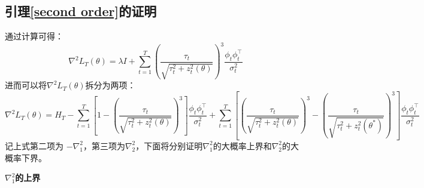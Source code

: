 \documentclass[UTF8,a4paper,10.5pt]{ctexart}
\begin{document}
\subsection{引理\ref{second order}的证明}
通过计算可得：
\begin{equation*}
	\nabla^2 L_T(\theta) = \lambda I + \sum_{t=1}^T \left(\frac{\tau_t}{\sqrt{\tau_t^2 + z_t^2(\theta)}}\right)^3 \frac{\phi_t\phi_t^\top}{\sigma_t^2}
\end{equation*}
进而可以将$\nabla^2L_T(\theta)$拆分为两项：
\begin{equation}
	\nabla^2 L_T(\theta)= H_T -\sum_{t=1}^T\left[1-\left(\frac{\tau_t}{\sqrt{\tau_t^2 + z_t^2(\theta)}}\right)^3\right]\frac{\phi_t\phi_t^\top}{\sigma_t^2} + \sum_{t=1}^T\left[\left(\frac{\tau_t}{\sqrt{\tau_t^2 + z_t^2(\theta)}}\right)^3 - \left(\frac{\tau_t}{\sqrt{\tau_t^2 + z_t^2(\theta^*)}}\right)^3 \right]\frac{\phi_t\phi_t^\top}{\sigma_t^2}
\end{equation}
记上式第二项为 $-\nabla^2_1$，第三项为$\nabla^2_2$，下面将分别证明$\nabla^2_1$的大概率上界和$\nabla^2_2$的大概率下界。

\textbf{$\nabla^2_1$的上界}
\end{document}
